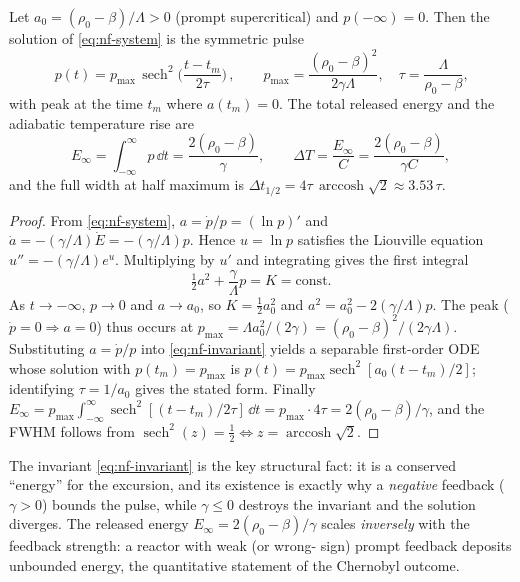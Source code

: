 \begin{theorem}
\label{thm:nf}
Let $a_0=(\rho_0-\beta)/\Lambda>0$ (prompt supercritical) and $p(-\infty)=0$. Then
the solution of \eqref{eq:nf-system} is the symmetric pulse
\begin{equation}
\boxed{\,p(t)=p_{\max}\,\operatorname{sech}^2\!\Big(\frac{t-t_m}{2\tau}\Big)\,},
\qquad
p_{\max}=\frac{(\rho_0-\beta)^2}{2\gamma\Lambda},\quad
\tau=\frac{\Lambda}{\rho_0-\beta},
\end{equation}
with peak at the time $t_m$ where $a(t_m)=0$. The total released energy and the
adiabatic temperature rise are
\begin{equation}
E_{\infty}=\int_{-\infty}^{\infty}\!p\,\dd t=\frac{2(\rho_0-\beta)}{\gamma},
\qquad \Delta T=\frac{E_\infty}{C}=\frac{2(\rho_0-\beta)}{\gamma C},
\end{equation}
and the full width at half maximum is
$\Delta t_{1/2}=4\tau\,\operatorname{arccosh}\sqrt2\approx 3.53\,\tau$.
\end{theorem}
\begin{proof}
From \eqref{eq:nf-system}, $a=\dot p/p=(\ln p)'$ and
$\dot a=-(\gamma/\Lambda)\dot E=-(\gamma/\Lambda)p$. Hence $u=\ln p$ satisfies the
Liouville equation $u''=-(\gamma/\Lambda)e^{u}$. Multiplying by $u'$ and
integrating gives the first integral
\begin{equation}
\tfrac12 a^2+\frac{\gamma}{\Lambda}p=K=\text{const}.
\label{eq:nf-invariant}
\end{equation}
As $t\to-\infty$, $p\to0$ and $a\to a_0$, so $K=\tfrac12a_0^2$ and
$a^2=a_0^2-2(\gamma/\Lambda)p$. The peak ($\dot p=0\Rightarrow a=0$) thus occurs at
$p_{\max}=\Lambda a_0^2/(2\gamma)=(\rho_0-\beta)^2/(2\gamma\Lambda)$. Substituting
$a=\dot p/p$ into \eqref{eq:nf-invariant} yields a separable first-order ODE whose
solution with $p(t_m)=p_{\max}$ is
$p(t)=p_{\max}\operatorname{sech}^2[a_0(t-t_m)/2]$; identifying $\tau=1/a_0$ gives
the stated form. Finally
$E_\infty=p_{\max}\int_{-\infty}^{\infty}\operatorname{sech}^2[(t-t_m)/2\tau]\,\dd t
=p_{\max}\cdot4\tau=2(\rho_0-\beta)/\gamma$, and the FWHM follows from
$\operatorname{sech}^2(z)=\tfrac12\Leftrightarrow z=\operatorname{arccosh}\sqrt2$.
\end{proof}

The invariant \eqref{eq:nf-invariant} is the key structural fact: it is a conserved
``energy'' for the excursion, and its existence is exactly why a \emph{negative}
feedback ($\gamma>0$) bounds the pulse, while $\gamma\le0$ destroys the invariant
and the solution diverges. The released energy $E_\infty=2(\rho_0-\beta)/\gamma$
scales \emph{inversely} with the feedback strength: a reactor with weak (or wrong-
sign) prompt feedback deposits unbounded energy, the quantitative statement of the
Chernobyl outcome.

